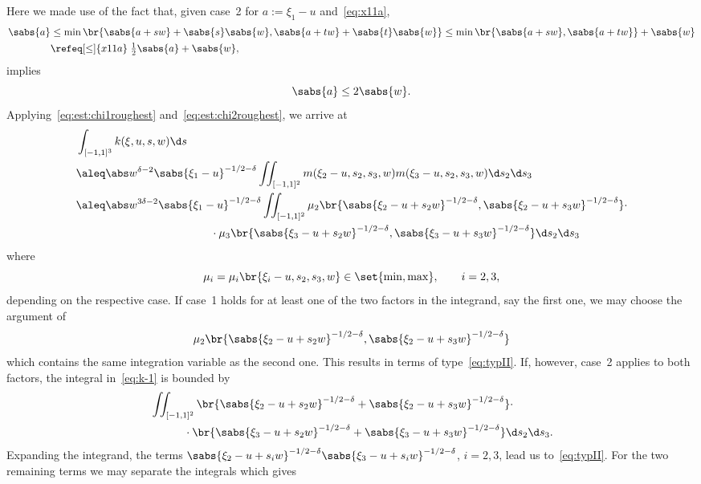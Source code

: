 Here we made use of the fact that, given case~2 for $a:=\xi_1-u$ and~\eqref{eq:x11a},
\begin{align*}
 \sabs{a} &\leq \min \br{\sabs{a+sw} + \sabs{s}\sabs{w}, \sabs{a+tw} + \sabs{t}\sabs{w}}
 \leq \min \br{\sabs{a+sw}, \sabs{a+tw} }+\sabs{w}\\
 &\refeq[\leq]{x11a} \;\tfrac12{\sabs{a}}+\sabs{w},
\end{align*}
implies
\begin{equation}\label{eq:est:chi12aleqw}
 \sabs{a} \leq  2\sabs{w}.
\end{equation}
Applying~\eqref{eq:est:chi1roughest} and~\eqref{eq:est:chi2roughest}, we arrive at
\begin{equation}\label{eq:k-1}
 \begin{split}
 &\int_{[-1,1]^3} {k(\xi,u,s,w)}\d s\\
 &\aleq \abs w^{\delta-2}\sabs{\xi_1-u}^{-1/2-\delta}\iint_{[-1,1]^2}m(\xi_2-u,s_2,s_3,w)m(\xi_3-u,s_2,s_3,w)\d s_2\d s_3 \\
 &\aleq \abs w^{3\delta-2}\sabs{\xi_1-u}^{-1/2-\delta}%
  \iint_{[-1,1]^2}\mu_2\br{\sabs{\xi_2-u+s_2w}^{-1/2-\delta},\sabs{\xi_2-u+s_3w}^{-1/2-\delta}} \cdot \\
 &\qquad\qquad\qquad\qquad\qquad\qquad{}\cdot\mu_3\br{\sabs{\xi_3-u+s_2w}^{-1/2-\delta},\sabs{\xi_3-u+s_3w}^{-1/2-\delta}}\d s_2\d s_3
 \end{split}
\end{equation}
where
\[ \mu_i=\mu_i\br{\xi_i-u,s_2,s_3,w}\in\set{\min,\max}, \qquad i=2,3, \]
depending on the respective case.
If case~1 holds for at least one of the two factors in the integrand, say the first one, we may choose the argument of
\[ \mu_2\br{\sabs{\xi_2-u+s_2w}^{-1/2-\delta},\sabs{\xi_2-u+s_3w}^{-1/2-\delta}}\]
which contains the same integration variable
as the second one. This results in terms of type~\eqref{eq:typII}.
If, however, case~2 applies to both factors, the integral in~\eqref{eq:k-1} is bounded by
\begin{align*}
 &\iint_{[-1,1]^2}\br{\sabs{\xi_2-u+s_2w}^{-1/2-\delta}+\sabs{\xi_2-u+s_3w}^{-1/2-\delta}}\cdot\\
 &\qquad\quad{}\cdot\br{\sabs{\xi_3-u+s_2w}^{-1/2-\delta}+\sabs{\xi_3-u+s_3w}^{-1/2-\delta}}\d s_2\d s_3.
\end{align*}
Expanding the integrand, the terms
$\sabs{\xi_2-u+s_iw}^{-1/2-\delta}\sabs{\xi_3-u+s_iw}^{-1/2-\delta}$, $i=2,3$, lead us to~\eqref{eq:typII}.
For the two remaining terms we may separate the integrals which gives
